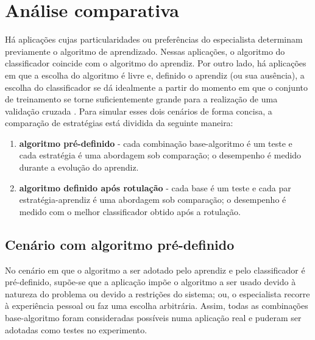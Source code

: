 \section{Análise comparativa}\label{comparativa}

Há aplicações cujas particularidades ou preferências do especialista determinam
previamente o algoritmo de aprendizado. 
Nessas aplicações, o algoritmo do classificador coincide com o algoritmo do aprendiz.
Por outro lado, há aplicações em que a escolha do algoritmo é livre e, definido o
aprendiz (ou sua ausência), a escolha do classificador se dá idealmente a partir do
momento em que o conjunto de treinamento se torne suficientemente grande para
a realização de uma validação cruzada .
Para simular esses dois cenários de forma concisa,
a comparação de estratégias está dividida da seguinte maneira:
\begin{enumerate}
  \item \textbf{algoritmo pré-definido} -
  cada combinação base-algoritmo é um teste e cada estratégia é uma abordagem sob comparação;
  o desempenho é medido durante a evolução do aprendiz.
  \item \textbf{algoritmo definido após rotulação} -
  cada base é um teste e cada par estratégia-aprendiz é uma abordagem sob comparação;
  o desempenho é medido com o melhor classificador obtido após a rotulação.
\end{enumerate}

\subsection{Cenário com algoritmo pré-definido}\label{predefinido}

No cenário em que o algoritmo a ser adotado pelo aprendiz e pelo classificador é
pré-definido, supõe-se que a aplicação impõe
o algoritmo a ser usado devido à natureza do problema ou devido a restrições do sistema; ou,
o especialista recorre à experiência pessoal ou faz uma escolha arbitrária.
Assim, todas as combinações base-algoritmo foram consideradas possíveis numa aplicação real
e puderam ser adotadas como testes no experimento.

